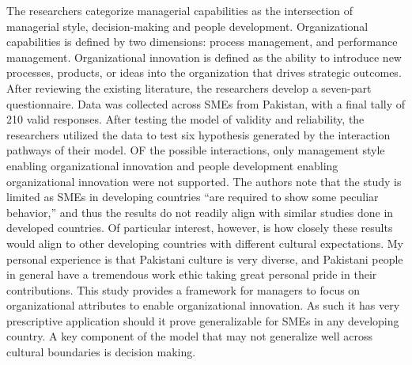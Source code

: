\begin{adjustwidth}{1in}{}
  \begin{hangpara}{.25in}{1}
\end{hangpara}
\end{adjustwidth}
The researchers categorize managerial capabilities as the intersection of managerial style, decision-making and people development. Organizational capabilities is defined by two dimensions: process management, and performance management. Organizational innovation is defined as the ability to introduce new processes, products, or ideas into the organization that drives strategic outcomes. After reviewing the existing literature, the researchers develop a seven-part questionnaire. Data was collected across SMEs from Pakistan, with a final tally of 210 valid responses. After testing the model of validity and reliability, the researchers utilized the data to test six hypothesis generated by the interaction pathways of their model. OF the possible interactions, only management style enabling organizational innovation and people development enabling organizational innovation were not supported. The authors note that the study is limited as SMEs in developing countries ``are required to show some peculiar behavior,'' and thus the results do not readily align with similar studies done in developed countries. Of particular interest, however, is how closely these results would align to other developing countries with different cultural expectations. My personal experience is that Pakistani culture is very diverse, and  Pakistani people in general have a tremendous work ethic taking great personal pride in their contributions. This study provides a framework for managers to focus on organizational attributes to enable organizational innovation. As such it has very prescriptive application should it prove generalizable for SMEs in any developing country. A key component of the model that may not generalize well across cultural boundaries is decision making.





